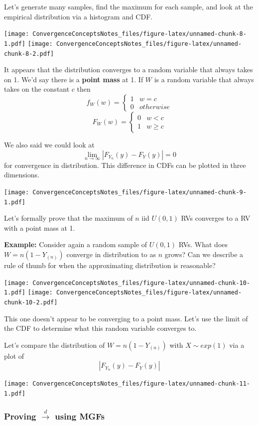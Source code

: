 \documentclass[
]{article}
\begin{document}
Let's generate many samples, find the maximum for each sample, and look
at the empirical distribution via a histogram and CDF.

\texttt{[image: ConvergenceConceptsNotes\_files/figure-latex/unnamed-chunk-8-1.pdf]}
\texttt{[image: ConvergenceConceptsNotes\_files/figure-latex/unnamed-chunk-8-2.pdf]}

It appears that the distribution converges to a random variable that
always takes on 1. We'd say there is a \textbf{point mass} at 1. If
\(W\) is a random variable that always takes on the constant \(c\) then
\[f_W(w) = \begin{cases} 1 & w = c\\ 0 & otherwise\end{cases}\]
\[F_W(w) = \begin{cases} 0 & w < c\\ 1 & w\geq c\end{cases}\]

We also said we could look at
\[\lim_{n \rightarrow \infty} |F_{Y_n}(y)-F_{Y}(y)|=0\] for convergence
in distribution. This difference in CDFs can be plotted in three
dimensions.

\texttt{[image: ConvergenceConceptsNotes\_files/figure-latex/unnamed-chunk-9-1.pdf]}

Let's formally prove that the maximum of \(n\) iid \(U(0,1)\) RVs
converges to a RV with a point mass at 1.

\textbf{Example:} Consider again a random sample of \(U(0,1)\) RVs. What
does \(W = n(1-Y_{(n)})\) converge in distribution to as \(n\) grows?
Can we describe a rule of thumb for when the approximating distribution
is reasonable?

\texttt{[image: ConvergenceConceptsNotes\_files/figure-latex/unnamed-chunk-10-1.pdf]}
\texttt{[image: ConvergenceConceptsNotes\_files/figure-latex/unnamed-chunk-10-2.pdf]}

This one doesn't appear to be converging to a point mass. Let's use the
limit of the CDF to determine what this random variable converges to.

Let's compare the distribution of \(W = n(1-Y_{(n)})\) with
\(X \sim exp(1)\) via a plot of \[|F_{Y_n}(y)-F_{Y}(y)|\]

\texttt{[image: ConvergenceConceptsNotes\_files/figure-latex/unnamed-chunk-11-1.pdf]}

\hypertarget{proving-stackreldrightarrow-using-mgfs}{%
\subsubsection{\texorpdfstring{Proving \(\stackrel{d}\rightarrow\) using
MGFs}{Proving \textbackslash stackrel\{d\}\textbackslash rightarrow using MGFs}}\label{proving-stackreldrightarrow-using-mgfs}}
\end{document}
